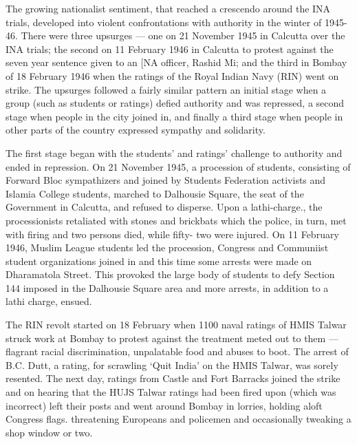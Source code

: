 The growing nationalist sentiment, that reached a crescendo around the INA trials, developed into violent confrontations with authority in the winter of 1945-46. There were three upsurges — one on 21 November 1945 in Calcutta over the INA trials; the second on 11 February 1946 in Calcutta to protest against the seven year sentence given to an [NA officer, Rashid Mi; and the third in Bombay of 18 February 1946 when the ratings of the Royal Indian Navy (RIN) went on strike. The upsurges followed a fairly similar pattern an initial stage when a group (such as students or ratings) defied authority and was repressed, a second stage when people in the city joined in, and finally a third stage when people in other parts of the country expressed sympathy and solidarity. 

The first stage began with the students' and ratings' challenge to authority and ended in repression. On 21 November 1945, a procession of students, consisting of Forward Bloc sympathizers and joined by Students Federation activists and Islamia College students, marched to Dalhousie Square, the seat of the Government in Calcutta, and refused to disperse. Upon a lathi-charge., the processionists retaliated with stones and brickbats which the police, in turn, met with firing and two persons died, while fifty- two were injured. On 11 February 1946, Muslim League students led the procession, Congress and Communiist student organizations joined in and this time some arrests were made on Dharamatola Street. This provoked the large body of students to defy Section 144 imposed in the Dalhousie Square area and more arrests, in addition to a lathi­ charge, ensued. 

The RIN revolt started on 18 February when 1100 naval ratings of HMIS Talwar struck work at Bombay to protest against the treatment meted out to them — flagrant racial discrimination, unpalatable food and abuses to boot. The arrest of B.C. Dutt, a rating, for scrawling `Quit India' on the HMIS Talwar, was sorely resented. The next day, ratings from Castle and Fort Barracks joined the strike and on hearing that the HUJS Talwar ratings had been fired upon (which was incorrect) left their posts and went around Bombay in lorries, holding aloft Congress flags. threatening Europeans and policemen and occasionally tweaking a shop window or two. 

